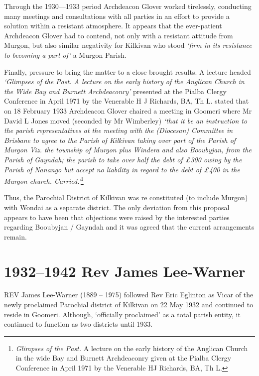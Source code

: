 Through the 1930---1933 period Archdeacon Glover worked tirelessly, conducting many meetings and consultations with all parties in an effort to provide a solution within a resistant atmosphere. It appears that the ever-patient Archdeacon Glover had to contend, not only with a resistant attitude from Murgon, but also similar negativity for Kilkivan who stood \emph{`firm in its resistance to becoming a part of'} a Murgon Parish.



Finally, pressure to bring the matter to a close brought results. A lecture headed \emph{`Glimpses of the Past. A lecture on the early history of the Anglican Church in the Wide Bay and Burnett Archdeaconry'} presented at the Pialba Clergy Conference in April 1971 by the Venerable H J Richards, BA, Th L. stated that on 18 February 1933 Archdeacon Glover chaired a meeting in Goomeri where Mr David L Jones moved (seconded by Mr Wimberley) \emph{`that it be an instruction to the parish representatives at the meeting with the (Diocesan) Committee in Brisbane to agree to the Parish of Kilkivan taking over part of the Parish of Murgon Viz. the township of Murgon plus Windera and also Booubyjan, from the Parish of Gayndah; the parish to take over half the debt of \pounds300 owing by the Parish of Nanango but accept no liability in regard to the debt of \pounds400 in the Murgon church. Carried.'}\footnote{\emph{Glimpses of the Past.} A lecture on the early history of the Anglican Church in the wide Bay and Burnett Archdeaconry given at the Pialba Clergy Conference in April 1971 by the Venerable HJ Richards, BA, Th L.}


Thus, the Parochial District of Kilkivan was re constituted (to include Murgon) with Wondai as a separate district. The only deviation from this proposal appears to have been that objections were raised by the interested parties regarding Booubyjan / Gayndah and it was agreed that the current arrangements remain.



\balance


\printendnotes[custom]
\setcounter{endnote}{0}
\chapter{1932--1942 Rev James Lee-Warner}
\nobalance


\lettrine[lines=3]{R}{EV}
 James Lee-Warner (1889 -- 1975) followed Rev Eric Eglinton as Vicar of the newly proclaimed Parochial district of Kilkivan on 22 May 1932 and continued to reside in Goomeri. Although, `officially proclaimed' as a total parish entity, it continued to function as two districts until 1933.

